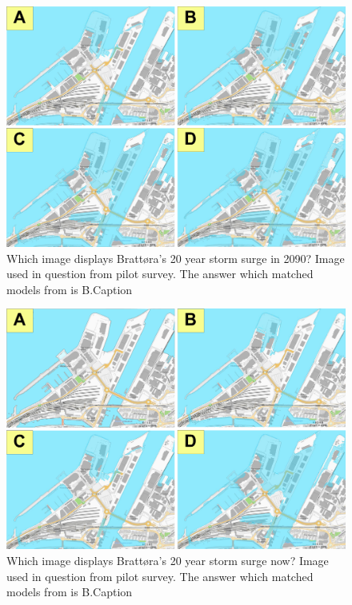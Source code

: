 \begin{figure}[h]
    \centering
    \includegraphics{fig/brattora question on 2090 20 yr storm surge quadrant.png}
    \caption{Which image displays Brattøra's 20 year storm surge in 2090? Image used in question from pilot survey. The answer which matched models from \cite{kartverket_se_2021} is B.Caption}
    \label{fig:brattora_2090_stormsurge}
\end{figure}

\begin{figure}[h]
    \centering
    \includegraphics{fig/brattora question on 2022 20 yr storm surge quadrant.png}
    \caption{Which image displays Brattøra's 20 year storm surge now? Image used in question from pilot survey. The answer which matched models from \cite{kartverket_se_2021} is B.Caption}
    \label{fig:brattora_2022_stormsurge}
\end{figure}

